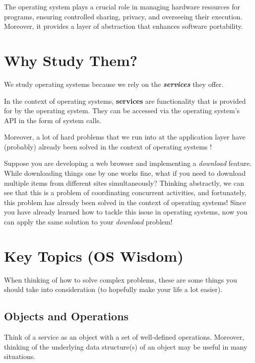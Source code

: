\documentclass{report}
\begin{document}
\begin{tcolorbox}[colback=violet!5!white,colframe=violet,title=Abstraction: The Operating System] 
  The operating system plays a crucial role in managing hardware resources for programs, ensuring
  controlled sharing, privacy, and overseeing their execution. Moreover, it provides a layer of
  abstraction that enhances software portability. 
\end{tcolorbox}


\section{Why Study Them?}
We study operating systems because we rely on the \textit{\textbf{services}} they offer.

\begin{tcolorbox}[title=Definition: Services]
  In the context of operating systems, \textbf{services} are functionality that is provided
  for by the operating system. They can be accessed via the operating system's API in the form of
  system calls. 
\end{tcolorbox}

Moreover, a lot of hard problems that we run into at the application layer have (probably) already
been solved in the context of operating systems !

\begin{tcolorbox}[colback=blue!5!white,colframe=black!75!blue,title=Example: Difficult Downloads]
  Suppose you are developing a web browser and implementing a \textit{download} feature. While
  downloading things one by one works fine, what if you need to download multiple items from different
  sites simultaneously? Thinking abstractly, we can see that this is a problem of coordinating
  concurrent activities, and fortunately, this problem has already been solved in the context of
  operating systems! Since you have already learned how to tackle this issue in operating systems, now
  you can apply the same solution to your \textit{download} problem!
\end{tcolorbox}


\section{Key Topics (OS Wisdom)}
When thinking of how to solve complex problems, these are some things you should take into
consideration (to hopefully make your life a lot easier).


\subsection*{Objects and Operations}
Think of a service as an object with a set of well-defined operations. Moreover, thinking of the
underlying data structure(s) of an object may be useful in many situations.  
\end{document}

